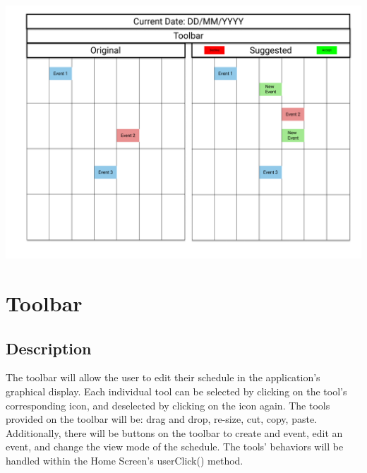 \documentclass{scrreprt}
\begin{document}
\begin{center}
\includegraphics[width=\textwidth]{diff.png}
\end{center}

\section{Toolbar}

\subsection{Description}
The toolbar will allow the user to edit their schedule in the application's graphical display.
Each individual tool can be selected by clicking on the tool's corresponding icon, and deselected by clicking on the icon again. The tools provided on the toolbar will be: drag and drop, re-size, cut, copy, paste. Additionally, there will be buttons on the toolbar to create and event, edit an event, and change the view mode of the schedule.
The tools' behaviors will be handled within the Home Screen's userClick() method.
\end{document}
